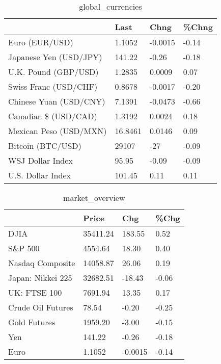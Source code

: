 \documentclass{article}%
\begin{document}
%


\begin{table}[htbp]%
\caption{global\_currencies}%
\centering%
\begin{adjustbox}{width=1\textwidth}%
\begin{tabular}{llll}
\toprule
                       &    Last &    Chng & \%Chng \\
\midrule
        Euro (EUR/USD) &  1.1052 & -0.0015 & -0.14 \\
Japanese Yen (USD/JPY) &  141.22 &   -0.26 & -0.18 \\
  U.K. Pound (GBP/USD) &  1.2835 &  0.0009 &  0.07 \\
 Swiss Franc (USD/CHF) &  0.8678 & -0.0017 & -0.20 \\
Chinese Yuan (USD/CNY) &  7.1391 & -0.0473 & -0.66 \\
  Canadian \$ (USD/CAD) &  1.3192 &  0.0024 &  0.18 \\
Mexican Peso (USD/MXN) & 16.8461 &  0.0146 &  0.09 \\
     Bitcoin (BTC/USD) &   29107 &     -27 & -0.09 \\
      WSJ Dollar Index &   95.95 &   -0.09 & -0.09 \\
     U.S. Dollar Index &  101.45 &    0.11 &  0.11 \\
\bottomrule
\end{tabular}
%
\end{adjustbox}%
\end{table}

%


\begin{table}[htbp]%
\caption{market\_overview}%
\centering%
\begin{adjustbox}{width=1\textwidth}%
\begin{tabular}{llll}
\toprule
                  &    Price &     Chg &  \%Chg \\
\midrule
             DJIA & 35411.24 &  183.55 &  0.52 \\
          S\&P 500 &  4554.64 &   18.30 &  0.40 \\
 Nasdaq Composite & 14058.87 &   26.06 &  0.19 \\
Japan: Nikkei 225 & 32682.51 &  -18.43 & -0.06 \\
     UK: FTSE 100 &  7691.94 &   13.35 &  0.17 \\
Crude Oil Futures &    78.54 &   -0.20 & -0.25 \\
     Gold Futures &  1959.20 &   -3.00 & -0.15 \\
              Yen &   141.22 &   -0.26 & -0.18 \\
             Euro &   1.1052 & -0.0015 & -0.14 \\
\bottomrule
\end{tabular}
%
\end{adjustbox}%
\end{table}

%
\end{document}
